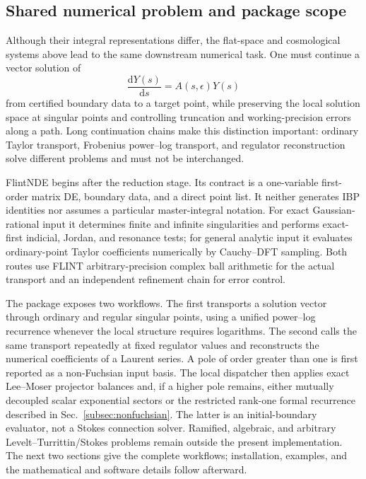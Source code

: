 \documentclass[11pt]{article}
\newcommand{\dd}{\mathrm d}
\newcommand{\eps}{\epsilon}
\begin{document}
\subsection{Shared numerical problem and package scope}

Although their integral representations differ, the flat-space and cosmological systems
above lead to the same downstream numerical task.  One must continue a vector solution of
\begin{equation}
  \frac{\dd Y(s)}{\dd s}=A(s,\eps)Y(s)
\end{equation}
from certified boundary data to a target point, while preserving the local solution space at
singular points and controlling truncation and working-precision errors along a path.  Long
continuation chains make this distinction important: ordinary Taylor transport, Frobenius
power--log transport, and regulator reconstruction solve different problems and must not be
interchanged.

FlintNDE begins after the reduction stage.  Its contract is a one-variable first-order matrix
DE, boundary data, and a direct point list.  It neither generates IBP identities nor assumes a
particular master-integral notation.  For exact Gaussian-rational input it determines finite
and infinite singularities and performs exact-first indicial, Jordan, and resonance tests;
for general analytic input it evaluates ordinary-point Taylor coefficients numerically by
Cauchy--DFT sampling.  Both routes use FLINT arbitrary-precision complex ball arithmetic for
the actual transport and an independent refinement chain for error control.

The package exposes two workflows.  The first transports a solution vector through ordinary
and regular singular points, using a unified power--log recurrence whenever the local
structure requires logarithms.  The second calls the same transport repeatedly at fixed
regulator values and reconstructs the numerical coefficients of a Laurent series.  A pole of
order greater than one is first reported as a non-Fuchsian input basis.  The local dispatcher
then applies exact Lee--Moser projector balances and, if a
higher pole remains, either mutually decoupled scalar exponential sectors or the restricted
rank-one formal recurrence described in Sec.~\ref{subsec:nonfuchsian}.  The latter is an
initial-boundary evaluator, not a Stokes connection solver.  Ramified, algebraic, and
arbitrary Levelt--Turrittin/Stokes problems remain outside the present implementation.  The next two
sections give the complete workflows; installation, examples, and the mathematical and
software details follow afterward.
\end{document}

